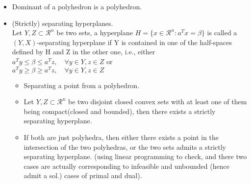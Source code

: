 \documentclass{article}
\begin{document}
\begin{itemize}
\item Dominant of a polyhedron is a polyhedron.
\item (Strictly) separating hyperplanes. \\Let $Y,Z\subset \mathcal{R}^n$ be two sets, a hyperplane $H = \{x\in\mathcal{R}^n: a^Tx=\beta\}$ is called a $(Y,X)$-separating hyperplane if Y is contained in one of the half-spaces defined by H and Z in the other one, i.e., either\\ $a^Ty\leq\beta\leq a^Tz,\quad \forall y\in Y, z\in Z$ or\\ $a^Ty\geq\beta\geq a^Tz,\quad \forall y\in Y, z\in Z$
\begin{itemize}
\item Separating a point from a polyhedron.
\item Let $Y,Z\subset\mathcal{R}^n$ be two disjoint closed convex sets with at least one of them being compact(closed and bounded), then there exists a strictly separating hyperplane.
\item If both are just polyhedra, then either there exists a point in the intersection of the two polyhedras, or the two sets admits a strictly separating hyperplane. (using linear programming to check, and there two cases are actually corresponding to infeasible and unbounded (hence admit a sol.) cases of primal and dual).
\end{itemize}
\end{itemize}
\end{document}
